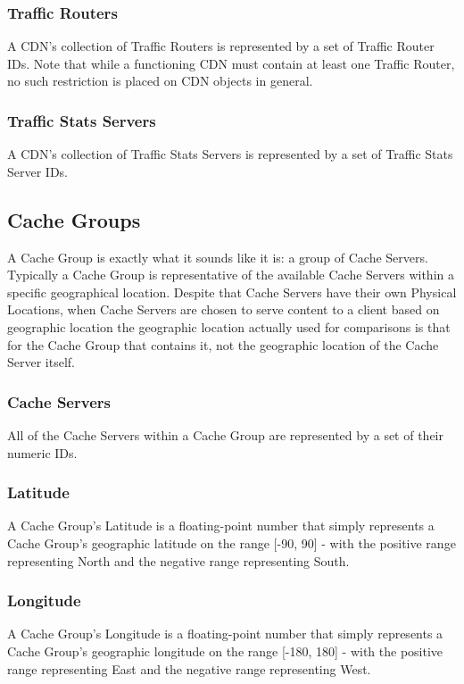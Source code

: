 \subsubsection{Traffic Routers}
A CDN's collection of Traffic Routers is represented by a set of Traffic Router
IDs. Note that while a functioning CDN must contain at least one Traffic Router,
no such restriction is placed on CDN objects in general.

\subsubsection{Traffic Stats Servers}
A CDN's collection of Traffic Stats Servers is represented by a set of Traffic
Stats Server IDs.

\subsection{Cache Groups}
A Cache Group is exactly what it sounds like it is: a group of Cache Servers.
Typically a Cache Group is representative of the available Cache Servers within a
specific geographical location. Despite that Cache Servers have their own
Physical Locations, when Cache Servers are chosen to serve content to a client
based on geographic location the geographic location actually used for
comparisons is that for the Cache Group that contains it, not the geographic
location of the Cache Server itself.

\subsubsection{Cache Servers}
All of the Cache Servers within a Cache Group are represented by a set of their
numeric IDs.

\subsubsection{Latitude}
A Cache Group's Latitude is a floating-point number that simply represents a
Cache Group's geographic latitude on the range [-90, 90] - with the positive
range representing North and the negative range representing South.

\subsubsection{Longitude}
A Cache Group's Longitude is a floating-point number that simply represents a
Cache Group's geographic longitude on the range [-180, 180] - with the positive
range representing East and the negative range representing West.


